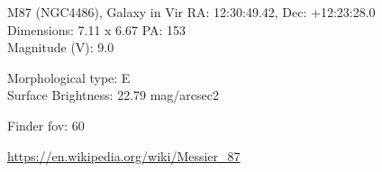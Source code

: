 \begin{block}{M87 (NGC4486), Galaxy in Vir}
    RA: 12:30:49.42, Dec: +12:23:28.0 \\ 
    Dimensions: 7.11 x 6.67 PA: 153 \\ 
    Magnitude (V): 9.0

    Morphological type: E \\ 
    Surface Brightness: 22.79 mag/arcsec2 


    Finder fov: 60 

    \url{https://en.wikipedia.org/wiki/Messier_87} 
\end{block}